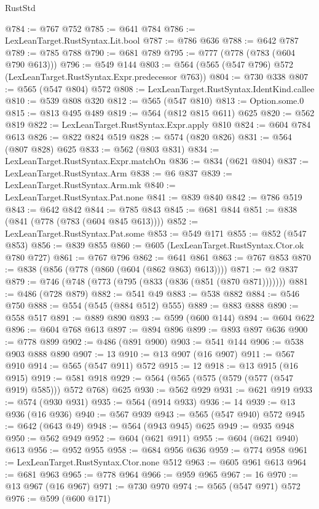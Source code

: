 \begin{lexlean}{RustStd}
\begin{coremodule}
@784 := @767 @752
@785 := @641 @784
@786 := LexLeanTarget.RustSyntax.Lit.bool
@787 := @786 @636
@788 := @642 @787
@789 := @785 @788
@790 := @681 @789
@795 := @777 (@778 (@783 (@604 @790 @613)))
@796 := @549 @144
@803 := @564 (@565 (@547 @796) @572 (LexLeanTarget.RustSyntax.Expr.predecessor @763))
@804 := @730 @338
@807 := @565 (@547 @804) @572
@808 := LexLeanTarget.RustSyntax.IdentKind.callee
@810 := @539 @808 @320
@812 := @565 (@547 @810)
@813 := Option.some.{0}
@815 := @813 @495 @489
@819 := @564 (@812 @815 @611) @625
@820 := @562 @819
@822 := LexLeanTarget.RustSyntax.Expr.apply @810
@824 := @604 @784 @613
@826 := @822 @824 @519
@828 := @574 (@820 @826)
@831 := @564 (@807 @828) @625
@833 := @562 (@803 @831)
@834 := LexLeanTarget.RustSyntax.Expr.matchOn
@836 := @834 (@621 @804)
@837 := LexLeanTarget.RustSyntax.Arm
@838 := @6 @837
@839 := LexLeanTarget.RustSyntax.Arm.mk
@840 := LexLeanTarget.RustSyntax.Pat.none
@841 := @839 @840
@842 := @786 @519
@843 := @642 @842
@844 := @785 @843
@845 := @681 @844
@851 := @838 (@841 (@778 (@783 (@604 @845 @613))))
@852 := LexLeanTarget.RustSyntax.Pat.some
@853 := @549 @171
@855 := @852 (@547 @853)
@856 := @839 @855
@860 := @605 (LexLeanTarget.RustSyntax.Ctor.ok @780 @727)
@861 := @767 @796
@862 := @641 @861
@863 := @767 @853
@870 := @838 (@856 (@778 (@860 (@604 (@862 @863) @613))))
@871 := @2 @837
@879 := @746 (@748 (@773 (@795 (@833 (@836 (@851 (@870 @871)))))))
@881 := @486 (@728 @879)
@882 := @541 @49
@883 := @538 @882
@884 := @546 @750
@888 := @554 (@545 (@884 @512) @555)
@889 := @883 @888
@890 := @558 @517
@891 := @889 @890
@893 := @599 (@600 @144)
@894 := @604 @622
@896 := @604 @768 @613
@897 := @894 @896
@899 := @893 @897 @636
@900 := @778 @899
@902 := @486 (@891 @900)
@903 := @541 @144
@906 := @538 @903 @888 @890
@907 := 13
@910 := @13 @907 (@16 @907)
@911 := @567 @910
@914 := @565 (@547 @911) @572
@915 := 12
@918 := @13 @915 (@16 @915)
@919 := @581 @918
@929 := @564 (@565 (@575 (@579 (@577 (@547 @919) @585))) @572 @768) @625
@930 := @562 @929
@931 := @621 @919
@933 := @574 (@930 @931)
@935 := @564 (@914 @933)
@936 := 14
@939 := @13 @936 (@16 @936)
@940 := @567 @939
@943 := @565 (@547 @940) @572
@945 := @642 (@643 @49)
@948 := @564 (@943 @945) @625
@949 := @935 @948
@950 := @562 @949
@952 := @604 (@621 @911)
@955 := @604 (@621 @940) @613
@956 := @952 @955
@958 := @684 @956 @636
@959 := @774 @958
@961 := LexLeanTarget.RustSyntax.Ctor.none @512
@963 := @605 @961 @613
@964 := @681 @963
@965 := @778 @964
@966 := @959 @965
@967 := 16
@970 := @13 @967 (@16 @967)
@971 := @730 @970
@974 := @565 (@547 @971) @572
@976 := @599 (@600 @171)

\end{coremodule}
\end{lexlean}
